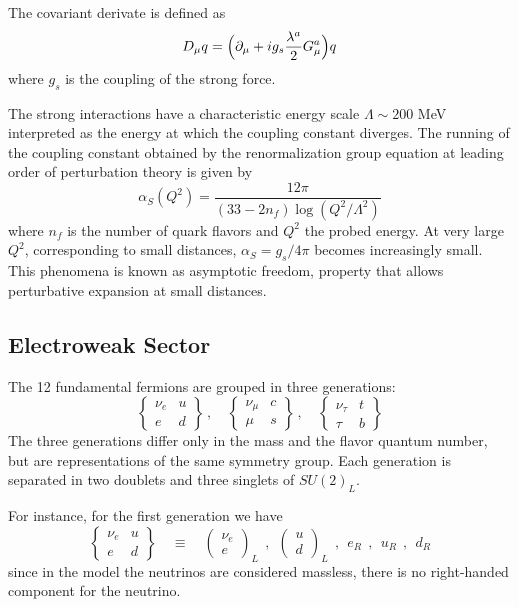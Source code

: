 \noindent The covariant derivate is defined as
\begin{equation}
D_\mu q = \Bigl(\partial_\mu +ig_s\frac{\lambda^a}{2}G_\mu^a\Bigr)q
\end{equation}
where $g_s$ is the coupling of the strong force. 

The strong interactions have a characteristic energy scale $\Lambda\sim 200$ MeV interpreted as the energy at which the coupling constant diverges. The running of the coupling constant obtained by the renormalization group equation at leading order of perturbation theory is given by
\begin{equation}
\alpha_S(Q^2) = \frac{12\pi}{(33-2n_f)\log(Q^2/\Lambda^2)}
\end{equation}
where $n_f$ is the number of quark flavors and $Q^2$ the probed energy. At very large $Q^2$, corresponding to small distances, $\alpha_S = g_s/4\pi$ becomes increasingly small. This phenomena is known as asymptotic freedom, property that allows perturbative expansion at small distances.

\subsection{Electroweak Sector}
The 12 fundamental fermions are grouped in three generations:
\begin{equation*}
\left\lbrace
\begin{array}{cc}
\nu_e & u \\
e     & d
\end{array}
\right\rbrace \,,\quad
\left\lbrace
\begin{array}{cc}
\nu_\mu & c \\
\mu     & s
\end{array}
\right\rbrace \,,\quad
\left\lbrace
\begin{array}{cc}
\nu_\tau & t \\
\tau     & b
\end{array}
\right\rbrace
\end{equation*}
The three generations differ only in the mass and the flavor quantum number, but are representations of the same symmetry group. Each generation is separated in two doublets and three singlets of $SU(2)_L$. 

For instance, for the first generation we have
\begin{equation*}
\left\lbrace
\begin{array}{cc}
\nu_e & u \\
e     & d
\end{array}
\right\rbrace \quad \equiv \quad
\left(\begin{array}{c}
\nu_e \\ e    
\end{array}\right)_{L} \:\:,\:\:
\left(\begin{array}{c}
u \\ d    
\end{array}\right)_{L} \:\:,\:\:
e_{R}\:\:,\:\:u_R\:\:,\:\:d_{R}
\end{equation*}
since in the model the neutrinos are considered massless, there is no right-handed component for the neutrino.

